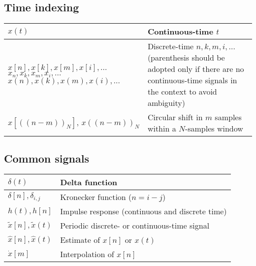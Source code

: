 \documentclass{article}
\begin{document}
\subsection{Time indexing}
\begin{xltabular}{\textwidth}{p{5.7cm}X}
	\(x(t)\)                                                                                                                                                                                      & Continuous-time \(t\)                                                                                                                              \\ \hline
	\(x[n], x[k], x[m], x[i], \dots\) \(x_n, x_k, x_m, x_i, \dots\) \(x(n), x(k), x(m), x(i), \dots\)                                                                                             & Discrete-time \(n, k, m, i, \dots\) (parenthesis should be adopted only if there are no continuous-time signals in the context to avoid ambiguity) \\ \hline
	\(x\left[ \left( \left( n - m \right) \right)_N \right]\)\cite{oppenheimDiscreteTimeSignalProcessing2009}, \(x \left( \left( n - m \right) \right)_N\)\cite{ingleDigitalSignalProcessing2000} & Circular shift in \(m\) samples within a \(N\)-samples window
\end{xltabular}
\subsection{Common signals}
\begin{xltabular}{\textwidth}{XX}
	\(\delta(t)\)                  & Delta function                                  \\ \hline
	\(\delta[n], \delta_{i,j}\)    & Kronecker function (\(n = i-j\))                \\ \hline
	\(h(t), h[n]\)                 & Impulse response (continuous and discrete time) \\ \hline
	\(\tilde{x}[n], \tilde{x}(t)\) & Periodic discrete- or continuous-time signal    \\ \hline
	\(\hat{x}[n], \hat{x}(t)\)     & Estimate of \(x[n]\) or \(x(t)\)                \\ \hline
	\(\dot{x}[m]\)                 & Interpolation of \(x[n]\)                       \\
\end{xltabular}
\end{document}
